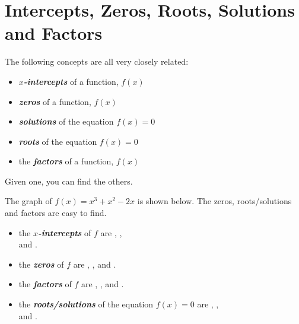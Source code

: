 \section{Intercepts, Zeros, Roots, Solutions and Factors}

\begin{myCenteredBox}[width=4in, colback=white, ]
    The following concepts are all very closely related:
    \begin{itemize}[nosep]
        \item {\bfseries\itshape $x$-intercepts} of a function, $f(x)$
        \item {\bfseries\itshape zeros} of a function, $f(x)$
        \item {\bfseries\itshape solutions} of the equation $f(x) = 0$
        \item {\bfseries\itshape roots} of the equation $f(x) = 0$
        \item the {\bfseries\itshape factors} of a function, $f(x)$
    \end{itemize}
    Given one, you can find the others.
\end{myCenteredBox}
The graph of 
{
    $f(x) = x^3 + x^2 -2x $
}
is shown below. 
The zeros, roots/solutions and factors are easy to find.
\begin{minipage}{0.3\textwidth}
\begin{center}
\end{center}
\end{minipage}
%
\begin{minipage}{0.69\textwidth}
    \begin{itemize}
        \item the {\bfseries\itshape $x$-intercepts} of $f$ are , ,\\ and .
        \item the {\bfseries\itshape zeros} of $f$ are , , and .
    \end{itemize}
    \begin{itemize}
        \item the {\bfseries\itshape factors} of $f$ are , , and .
        \item the {\bfseries\itshape roots/solutions} of the equation $f(x)=0$ are , ,\\ and .
    \end{itemize}
\end{minipage}


